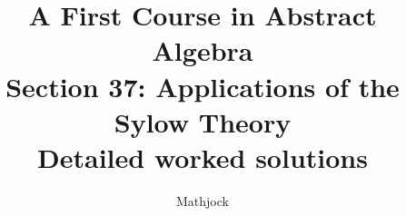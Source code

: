 
\title{\textbf{A First Course in Abstract Algebra}\\[0.3em]Section 37: Applications of the Sylow Theory\\[0.3em]\large Detailed worked solutions}
\author{Mathjock}
\date{}

\maketitle
\bookinfo
\tableofcontents
\clearpage
\renewcommand{\thesection}{37}
\renewcommand{\theHsection}{fraleigh.37}


